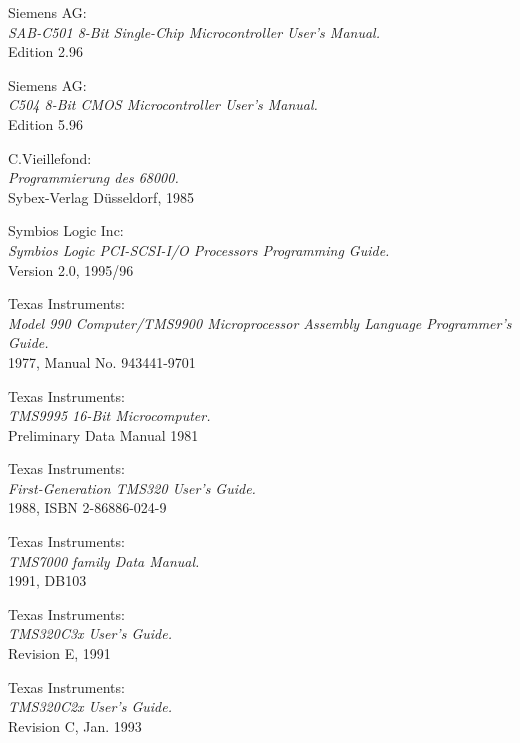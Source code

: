 \documentclass[12pt,twoside]{report}
\begin{document}
\begin{thebibliography}{99}
 Siemens AG: \\
                  {\em SAB-C501 8-Bit Single-Chip Microcontroller User's
                   Manual.\/} \\
                  Edition 2.96

 Siemens AG: \\
                  {\em C504 8-Bit CMOS Microcontroller User's Manual.\/} \\
                  Edition 5.96

 C.Vieillefond: \\
                 {\em Programmierung des 68000.\/} \\
                 Sybex-Verlag D\"usseldorf, 1985

 Symbios Logic Inc: \\
                 {\em Symbios Logic PCI-SCSI-I/O Processors Programming   
                 Guide.\/} \\
                 Version 2.0, 1995/96
                 
  Texas Instruments: \\
                 {\em Model 990 Computer/TMS9900 Microprocessor
                      Assembly Language Programmer's Guide.\/} \\
                 1977, Manual No. 943441-9701

 Texas Instruments: \\
                 {\em TMS9995 16-Bit Microcomputer.\/} \\
                 Preliminary Data Manual
                 1981

 Texas Instruments: \\
                {\em First-Generation TMS320 User's Guide.\/} \\
                1988, ISBN 2-86886-024-9

 Texas Instruments: \\
                 {\em TMS7000 family Data Manual.\/} \\
                 1991, DB103

 Texas Instruments: \\
                {\em TMS320C3x User's Guide.\/} \\
                Revision E, 1991

 Texas Instruments: \\
                {\em TMS320C2x User's Guide.\/} \\
                Revision C, Jan. 1993


\end{thebibliography}
\end{document}
